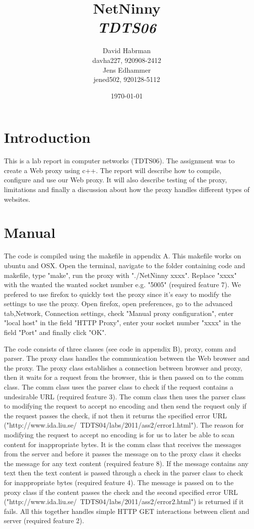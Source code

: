 \documentclass[10pt]{article}
\title{NetNinny\\
\emph{TDTS06}}
\author{David Habrman \\ davha227, 920908-2412\\
Jens Edhammer \\ jened502, 920128-5112 }
\date{\today}
\begin{document}
\maketitle

\newpage
\tableofcontents
\newpage

\section{Introduction}
This is a lab report in computer networks (TDTS06). The assignment was
to create a Web proxy using c++. The report will describe how to compile,
configure and use our Web proxy. It will also describe testing of the proxy,
limitations and finally a discussion about how the proxy handles different
types of websites.

\section{Manual}
The code is compiled using the makefile in appendix A. This makefile works on
ubuntu and OSX. Open the terminal, navigate to the folder containing code and
makefile, type "make", run the proxy with "./NetNinny xxxx". Replace "xxxx"
with the wanted the wanted socket number e.g. "5005" (required feature 7).
We prefered to use firefox to quickly test the proxy since it's easy to
modify the settings to use the proxy. Open firefox, open preferences, go to
the advanced tab,Network, Connection settings, check
"Manual proxy configuration", enter "local host" in the field "HTTP Proxy",
enter your socket number "xxxx" in the field "Port" and finally click "OK".

The code consists of three classes (see code in appendix B), proxy, comm and
parser. The proxy class handles the communication between the Web browser and
the proxy. The proxy class establishes a connection between browser and proxy,
then it waits for a request from the browser, this is then passed on to the comm
class. The comm class uses the parser class to check if the request contains a
undesirable URL (required feature 3). The comm class then uses the parser class
to modifying the request to accept no encoding and then send the request only if
the request passes the check, if not then it returns the specified error URL
("http://www.ida.liu.se/~TDTS04/labs/2011/ass2/error1.html"). The reason
for modifying the request to accept no encoding is for us to later be able to
scan content for inappropriate bytes.
It is the comm class that receives the messages from the server and before
it passes the message on to the proxy class it checks the message for any
text content (required feature 8). If the message contains any text then the
text content is passed through a check in the parser class to check for
inappropriate bytes (required feature 4). The message is passed on to the
proxy class if the content passes the check and the second specified error URL
("http://www.ida.liu.se/~TDTS04/labs/2011/ass2/error2.html") is returned if it
fails. All this together handles simple HTTP GET interactions between client
and server (required feature 2).
\end{document}
